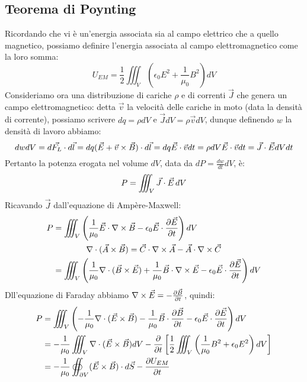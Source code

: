 \subsection{Teorema di Poynting}

Ricordando che vi è un'energia associata sia al campo elettrico che a quello magnetico, possiamo definire l'energia associata al campo elettromagnetico come la loro somma:
\begin{equation}
	U_{EM} = \frac{1}{2} \iiint_V \left( \epsilon_0 E^2 + \frac{1}{\mu_0} B^2\right) dV
	\label{eq:29}
\end{equation}
%
Consideriamo ora una distribuzione di cariche $ \rho $ e di correnti $ \vec{J} $ che genera un campo elettromagnetico: detta $ \vec{v} $ la velocità delle cariche in moto (data la densità di corrente), possiamo scrivere $ dq = \rho dV $ e $ \vec{J} dV = \rho \vec{v} dV $, dunque definendo $ w $ la densità di lavoro abbiamo:
\begin{equation}
	dw dV = d\vec{F_L} \cdot d\vec{l} = dq (\vec{E} + \vec{v}\times\vec{B})\cdot d\vec{l} = dq \vec{E}\cdot\vec{v} dt = \rho dV \vec{E}\cdot\vec{v} dt = \vec{J}\cdot\vec{E} dV dt
	\label{eq:30}
\end{equation}
Pertanto la potenza erogata nel volume $ dV $, data da $ dP = \frac{dw}{dt} dV $, è:
\begin{equation}
	P = \iiint_V \vec{J}\cdot\vec{E} \,dV
	\label{eq:31}
\end{equation}
Ricavando $ \vec{J} $ dall'equazione di Ampère-Maxwell:
\begin{equation}
	\begin{split}
		P &= \iiint_V \left(\frac{1}{\mu_0} \vec{E} \cdot \nabla\times\vec{B} - \epsilon_0 \vec{E} \cdot \frac{\partial\vec{E}}{\partial t}\right) dV \\ 
		  &\qquad\qquad \nabla\cdot(\vec{A}\times\vec{B}) = \vec{C} \cdot \nabla\times\vec{A} - \vec{A} \cdot \nabla\times\vec{C} \\ 
		  &= \iiint_V \left(\frac{1}{\mu_0} \nabla\cdot(\vec{B}\times\vec{E}) + \frac{1}{\mu_0} \vec{B} \cdot \nabla\times\vec{E} - \epsilon_0 \vec{E} \cdot \frac{\partial\vec{E}}{\partial t}\right) dV
	\end{split}
	\label{eq:32}
\end{equation}
Dll'equazione di Faraday abbiamo $ \nabla\times\vec{E} = - \frac{\partial\vec{B}}{\partial t} $, quindi:
\begin{equation}
	\begin{split}
		P &= \iiint_V \left( - \frac{1}{\mu_0} \nabla\cdot(\vec{E}\times\vec{B}) - \frac{1}{\mu_0} \vec{B} \cdot \frac{\partial\vec{B}}{\partial t} - \epsilon_0 \vec{E} \cdot \frac{\partial\vec{E}}{\partial t}\right) dV \\ 
		  &= - \frac{1}{\mu_0} \iiint_V \nabla\cdot(\vec{E}\times\vec{B}) dV - \frac{\partial}{\partial t} \left[\frac{1}{2} \iiint_V \left(\frac{1}{\mu_0} B^2 + \epsilon_0 E^2\right) dV \right] \\ 
		  &= - \frac{1}{\mu_0} \oiint_{\partial V} (\vec{E}\times\vec{B})\cdot d\vec{S} - \frac{\partial U_{EM}}{\partial t}
	\end{split}
	\label{eq:33}
\end{equation}
